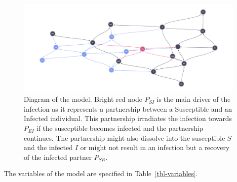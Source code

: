 \documentclass[
  letterpaper,
  DIV=11,
  numbers=noendperiod]{scrartcl}
\begin{document}
\begin{figure}

{\centering \includegraphics[width=1\textwidth,height=\textheight]{images/model_diagram.svg}

}

\caption{\label{fig-diagram-model}Diagram of the model. Bright red node
\(P_{SI}\) is the main driver of the infection as it represents a
partnership between a Susceptible and an Infected individual. This
partnership irradiates the infection towards \(P_{EI}\) if the
susceptible becomes infected and the partnership continues. The
partnership might also dissolve into the susceptible \(S\) and the
infected \(I\) or might not result in an infection but a recovery of the
infected partner \(P_{SR}\).}

\end{figure}

The variables of the model are specified in Table~\ref{tbl-variables}.
\end{document}
